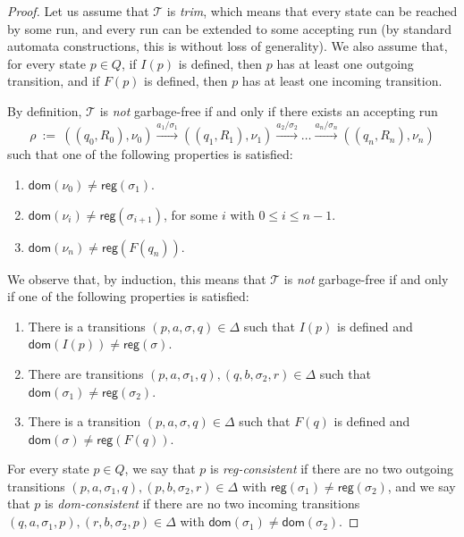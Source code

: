 \documentclass[
a4paper
]{article}
\theoremstyle{plain}
\theoremstyle{definition}
\theoremstyle{remark}
\newcommand{\dom}{\operatorname{dom}}
\newcommand{\nsst}{\mathcal{T}}
\newcommand{\reg}{\operatorname{reg}}
\renewcommand{\operatorname}[1]{\textsf{#1}}
\begin{document}
\begin{proof}
	Let us assume that $\nsst$ is \emph{trim}, which means that every state can be reached by some run, and every run can be extended to some accepting run (by standard automata constructions, this is without loss of generality). We also assume that, for every state $p \in Q$, if $I(p)$ is defined, then $p$ has at least one outgoing transition, and if $F(p)$ is defined, then $p$ has at least one incoming transition. \par
	By definition, $\nsst$ is \emph{not} garbage-free if and only if there exists an accepting run 	
	\begin{equation*}
		\rho \ := \ ((q_0, R_0), \nu_0) \xrightarrow{a_1/\sigma_1} ((q_1, R_1), \nu_1) \xrightarrow{a_2 /\sigma_2} \ldots \xrightarrow{a_n/\sigma_{n}} ((q_{n}, R_n), \nu_n)
	\end{equation*}
	such that one of the following properties is satisfied:
	\begin{enumerate}
		\item[] $\dom(\nu_0) \neq \reg(\sigma_1)$.
		\item[] $\dom(\nu_i) \neq \reg(\sigma_{i+1})$, for some $i$ with $0 \leq i \leq n-1$.
		\item[] $\dom(\nu_n) \neq \reg(F(q_n))$. 
	\end{enumerate}
	
	We observe that, by induction, this means that $\nsst$ is \emph{not} garbage-free if and only if one of the following properties is satisfied:
	\begin{enumerate}
		\item There is a transitions $(p, a, \sigma, q) \in \Delta$ such that $I(p)$ is defined and $\dom(I(p)) \neq \reg(\sigma)$.
		\item There are transitions $(p, a, \sigma_1, q), (q, b, \sigma_2, r) \in \Delta$ such that $\dom(\sigma_1) \neq \reg(\sigma_2)$.
		\item There is a transition $(p, a, \sigma, q) \in \Delta$ such that $F(q)$ is defined and $\dom(\sigma) \neq \reg(F(q))$.
	\end{enumerate}
	
	For every state $p \in Q$, we say that $p$ is \emph{reg-consistent} if there are no two outgoing transitions $(p, a, \sigma_1, q), (p, b, \sigma_2, r) \in \Delta$ with $\reg(\sigma_1) \neq \reg(\sigma_2)$, and we say that $p$ is \emph{dom-consistent} if there are no two incoming transitions $(q, a, \sigma_1, p), (r, b, \sigma_2, p) \in \Delta$ with $\dom(\sigma_1) \neq \dom(\sigma_2)$.
	

\end{proof}
\end{document}
